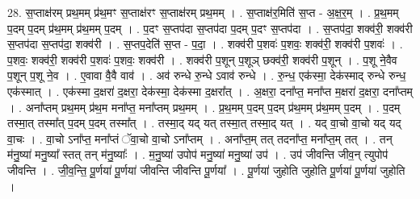 \documentclass[17pt]{extarticle}
\begin{document}
28. स॒प्ताक्ष॑रम् प्रथ॒मम् प्र॑थ॒मꣳ स॒प्ताक्ष॑रꣳ स॒प्ताक्ष॑रम् प्रथ॒मम् । . स॒प्ताक्ष॑र॒मिति॑ स॒प्त - अ॒क्ष॒र॒म् । . प्र॒थ॒मम् प॒दम् प॒दम् प्र॑थ॒मम् प्र॑थ॒मम् प॒दम् । . प॒दꣳ स॒प्तप॑दा स॒प्तप॑दा प॒दम् प॒दꣳ स॒प्तप॑दा । . स॒प्तप॑दा॒ शक्व॑री॒ शक्व॑री स॒प्तप॑दा स॒प्तप॑दा॒ शक्व॑री । . स॒प्तप॒देति॑ स॒प्त - प॒दा॒ । . शक्व॑री प॒शवः॑ प॒शवः॒ शक्व॑री॒ शक्व॑री प॒शवः॑ । . प॒शवः॒ शक्व॑री॒ शक्व॑री प॒शवः॑ प॒शवः॒ शक्व॑री । . शक्व॑री प॒शून् प॒शूञ् छक्व॑री॒ शक्व॑री प॒शून् । . प॒शू ने॒वैव प॒शून् प॒शू ने॒व । . ए॒वावा वै॒वै वाव॑ । . अव॑ रुन्धे रु॒न्धे ऽवाव॑ रुन्धे । . रु॒न्ध॒ एक॑स्मा॒ देक॑स्माद् रुन्धे रुन्ध॒ एक॑स्मात् । . एक॑स्मा द॒क्षरा॑ द॒क्षरा॒ देक॑स्मा॒ देक॑स्मा द॒क्षरा᳚त् । . अ॒क्षरा॒ दना᳚प्त॒ मना᳚प्त म॒क्षरा॑ द॒क्षरा॒ दना᳚प्तम् । . अना᳚प्तम् प्रथ॒मम् प्र॑थ॒म मना᳚प्त॒ मना᳚प्तम् प्रथ॒मम् । . प्र॒थ॒मम् प॒दम् प॒दम् प्र॑थ॒मम् प्र॑थ॒मम् प॒दम् । . प॒दम् तस्मा॒त् तस्मा᳚त् प॒दम् प॒दम् तस्मा᳚त् । . तस्मा॒द् यद् यत् तस्मा॒त् तस्मा॒द् यत् । . यद् वा॒चो वा॒चो यद् यद् वा॒चः । . वा॒चो ऽना᳚प्त॒ मना᳚प्तं ॅवा॒चो वा॒चो ऽना᳚प्तम् । . अना᳚प्त॒म् तत् तदना᳚प्त॒ मना᳚प्त॒म् तत् । . तन् म॑नु॒ष्या॑ मनु॒ष्या᳚ स्तत् तन् म॑नु॒ष्याः᳚ । . म॒नु॒ष्या॑ उपोप॑ मनु॒ष्या॑ मनु॒ष्या॑ उप॑ । . उप॑ जीवन्ति जीव॒न् त्युपोप॑ जीवन्ति । . जी॒व॒न्ति॒ पू॒र्णया॑ पू॒र्णया॑ जीवन्ति जीवन्ति पू॒र्णया᳚ । . पू॒र्णया॑ जुहोति जुहोति पू॒र्णया॑ पू॒र्णया॑ जुहोति । \newline
\end{document}
